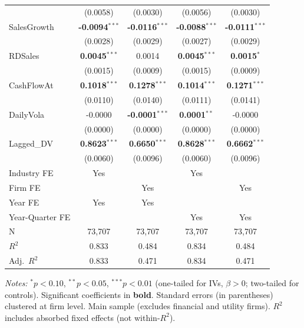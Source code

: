 \documentclass[11pt,a4paper]{article}
\begin{document}
\begin{table}[htbp]
\begin{tabular}{lcccc}
 & (0.0058) & (0.0030) & (0.0056) & (0.0030) \\
SalesGrowth & \textbf{-0.0094}$^{***}$ & \textbf{-0.0116}$^{***}$ & \textbf{-0.0088}$^{***}$ & \textbf{-0.0111}$^{***}$ \\
 & (0.0028) & (0.0029) & (0.0027) & (0.0029) \\
RDSales & \textbf{0.0045}$^{***}$ & 0.0014 & \textbf{0.0045}$^{***}$ & \textbf{0.0015}$^{*}$ \\
 & (0.0015) & (0.0009) & (0.0015) & (0.0009) \\
CashFlowAt & \textbf{0.1018}$^{***}$ & \textbf{0.1278}$^{***}$ & \textbf{0.1014}$^{***}$ & \textbf{0.1271}$^{***}$ \\
 & (0.0110) & (0.0140) & (0.0111) & (0.0141) \\
DailyVola & -0.0000 & \textbf{-0.0001}$^{***}$ & \textbf{0.0001}$^{**}$ & -0.0000 \\
 & (0.0000) & (0.0000) & (0.0000) & (0.0000) \\
Lagged\_DV & \textbf{0.8623}$^{***}$ & \textbf{0.6650}$^{***}$ & \textbf{0.8628}$^{***}$ & \textbf{0.6662}$^{***}$ \\
 & (0.0060) & (0.0096) & (0.0060) & (0.0096) \\
\midrule
Industry FE & Yes &  & Yes &  \\
Firm FE &  & Yes &  & Yes \\
Year FE & Yes & Yes &  &  \\
Year-Quarter FE &  &  & Yes & Yes \\
\midrule
N & 73,707 & 73,707 & 73,707 & 73,707 \\
$R^2$ & 0.833 & 0.484 & 0.834 & 0.484 \\
Adj.~$R^2$ & 0.833 & 0.471 & 0.834 & 0.471 \\
\bottomrule
\end{tabular}
\begin{minipage}{\linewidth}
\vspace{2pt}\scriptsize
\textit{Notes:} $^{*}p<0.10$, $^{**}p<0.05$, $^{***}p<0.01$ (one-tailed for IVs, $\beta > 0$; two-tailed for controls).
 Significant coefficients in \textbf{bold}.
 Standard errors (in parentheses) clustered at firm level.
 Main sample (excludes financial and utility firms).
 $R^2$ includes absorbed fixed effects (not within-$R^2$).
\end{minipage}
\end{table}
\clearpage
\end{document}
